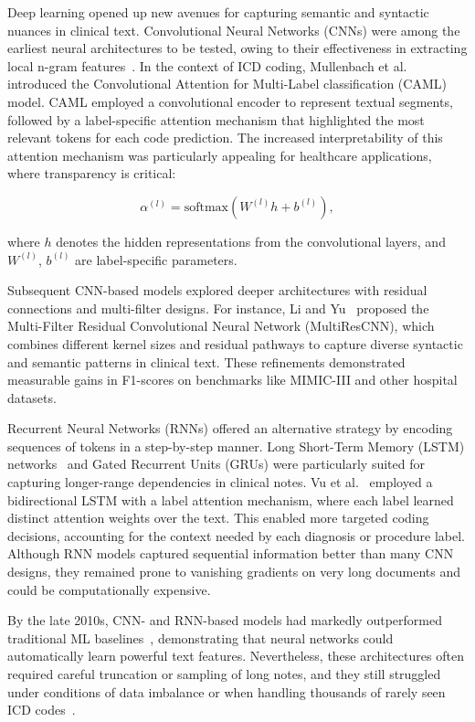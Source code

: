 Deep learning opened up new avenues for capturing semantic and syntactic nuances in clinical text. Convolutional Neural Networks (CNNs) were among the earliest neural architectures to be tested, owing to their effectiveness in extracting local n-gram features~\citep{kim2014convolutional}. In the context of ICD coding, Mullenbach et al.~\citep{mullenbach2018explainable} introduced the Convolutional Attention for Multi-Label classification (CAML) model. CAML employed a convolutional encoder to represent textual segments, followed by a label-specific attention mechanism that highlighted the most relevant tokens for each code prediction. The increased interpretability of this attention mechanism was particularly appealing for healthcare applications, where transparency is critical:

\begin{equation}\label{eq:p1:caml-attention}
\alpha^{(l)} = \mathrm{softmax}(W^{(l)} h + b^{(l)}),
\end{equation}

where \(h\) denotes the hidden representations from the convolutional layers, and \(W^{(l)}\), \(b^{(l)}\) are label-specific parameters.

Subsequent CNN-based models explored deeper architectures with residual connections and multi-filter designs. For instance, Li and Yu~\citep{li2020multi} proposed the Multi-Filter Residual Convolutional Neural Network (MultiResCNN), which combines different kernel sizes and residual pathways to capture diverse syntactic and semantic patterns in clinical text. These refinements demonstrated measurable gains in F1-scores on benchmarks like MIMIC-III and other hospital datasets.

Recurrent Neural Networks (RNNs) offered an alternative strategy by encoding sequences of tokens in a step-by-step manner. Long Short-Term Memory (LSTM) networks~\citep{hochreiter1997long} and Gated Recurrent Units (GRUs) were particularly suited for capturing longer-range dependencies in clinical notes. Vu et al.~\citep{vu2020label, vu2020ijcai} employed a bidirectional LSTM with a label attention mechanism, where each label learned distinct attention weights over the text. This enabled more targeted coding decisions, accounting for the context needed by each diagnosis or procedure label. Although RNN models captured sequential information better than many CNN designs, they remained prone to vanishing gradients on very long documents and could be computationally expensive. 

By the late 2010s, CNN- and RNN-based models had markedly outperformed traditional ML baselines~\citep{perotte2014diagnosis}, demonstrating that neural networks could automatically learn powerful text features. Nevertheless, these architectures often required careful truncation or sampling of long notes, and they still struggled under conditions of data imbalance or when handling thousands of rarely seen ICD codes~\citep{wrenn2010quantifying}.


